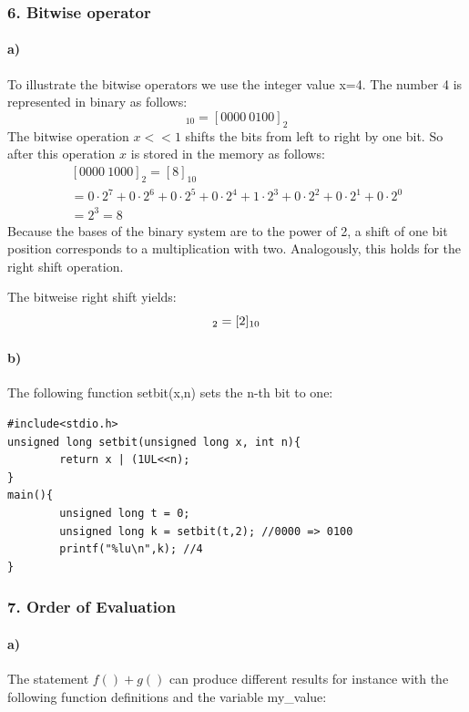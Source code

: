 \documentclass[12pt]{article}
\begin{document}
\subsubsection*{6. Bitwise operator}
\paragraph{a)}
To illustrate the bitwise operators we use the integer value x=4.
The number 4 is represented in binary as follows:
\begin{equation}
[4]_{10} = [0000 \: 0100 ]_{2}
\end{equation}
The bitwise operation $x<<1$ shifts the bits from left to right by one bit. So after this operation $x$ is stored in the memory as follows:
\begin{equation}
\begin{split}
[0000 \: 1000 ]_{2} = [8]_{10} \\ 
= 0 \cdot 2^7 + 0 \cdot 2^6 + 0 \cdot 2^5 + 0 \cdot 2^4 + 1 \cdot 2^3 + 0 \cdot 2^2 + 0 \cdot 2^1 + 0 \cdot 2^0 \\
= 2^3 = 8
\end{split}
\end{equation}
Because the bases of the binary system are to the power of 2, a shift of one bit position corresponds to a multiplication with two. Analogously, this  holds for the right shift operation.


The bitweise right shift yields:
\begin{equation}
[0000 \: 0010 ]_{2} = [2]_{10} \\ 
\end{equation}
\paragraph{b)}
The following function setbit(x,n) sets the n-th bit to one:
\begin{lstlisting}
#include<stdio.h>
unsigned long setbit(unsigned long x, int n){
        return x | (1UL<<n);
}
main(){
        unsigned long t = 0;
        unsigned long k = setbit(t,2); //0000 => 0100
        printf("%lu\n",k); //4
}
\end{lstlisting}

\subsubsection*{7. Order of Evaluation}
\paragraph{a)}
The statement $f() + g()$ can produce different results for instance with the following function definitions and the variable my\_value:
\end{document}

